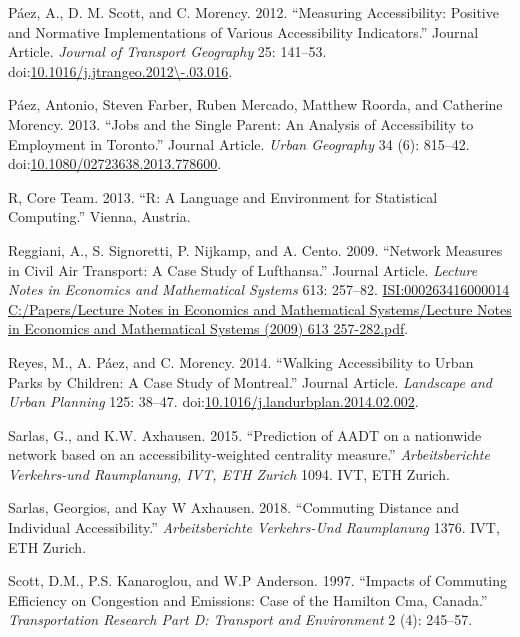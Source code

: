 \documentclass[]{elsarticle} %
\begin{document}
\hypertarget{ref-Paez2012positive}{}
Páez, A., D. M. Scott, and C. Morency. 2012. ``Measuring Accessibility:
Positive and Normative Implementations of Various Accessibility
Indicators.'' Journal Article. \emph{Journal of Transport Geography} 25:
141--53.
doi:\href{https://doi.org/10.1016/j.jtrangeo.2012/-.03.016}{10.1016/j.jtrangeo.2012\textbackslash{}-.03.016}.

\hypertarget{ref-Paez2013jobs}{}
Páez, Antonio, Steven Farber, Ruben Mercado, Matthew Roorda, and
Catherine Morency. 2013. ``Jobs and the Single Parent: An Analysis of
Accessibility to Employment in Toronto.'' Journal Article. \emph{Urban
Geography} 34 (6): 815--42.
doi:\href{https://doi.org/10.1080/02723638.2013.778600}{10.1080/02723638.2013.778600}.

\hypertarget{ref-Rcore}{}
R, Core Team. 2013. ``R: A Language and Environment for Statistical
Computing.'' Vienna, Austria.

\hypertarget{ref-Reggiani2009network}{}
Reggiani, A., S. Signoretti, P. Nijkamp, and A. Cento. 2009. ``Network
Measures in Civil Air Transport: A Case Study of Lufthansa.'' Journal
Article. \emph{Lecture Notes in Economics and Mathematical Systems} 613:
257--82.
\href{ISI:000263416000014\%0AC:/Papers/Lecture\%20Notes\%20in\%20Economics\%20and\%20Mathematical\%20Systems/Lecture\%20Notes\%20in\%20Economics\%20and\%20Mathematical\%20Systems\%20(2009)\%20613\%20257-282.pdf}{ISI:000263416000014
C:/Papers/Lecture Notes in Economics and Mathematical Systems/Lecture Notes in Economics and Mathematical Systems (2009) 613 257-282.pdf}.

\hypertarget{ref-Reyes2014}{}
Reyes, M., A. Páez, and C. Morency. 2014. ``Walking Accessibility to
Urban Parks by Children: A Case Study of Montreal.'' Journal Article.
\emph{Landscape and Urban Planning} 125: 38--47.
doi:\href{https://doi.org/10.1016/j.landurbplan.2014.02.002}{10.1016/j.landurbplan.2014.02.002}.

\hypertarget{ref-Sarlas2015}{}
Sarlas, G., and K.W. Axhausen. 2015. ``Prediction of AADT on a
nationwide network based on an accessibility-weighted centrality
measure.'' \emph{Arbeitsberichte Verkehrs-und Raumplanung, IVT, ETH
Zurich} 1094. IVT, ETH Zurich.

\hypertarget{ref-Sarlas2019}{}
Sarlas, Georgios, and Kay W Axhausen. 2018. ``Commuting Distance and
Individual Accessibility.'' \emph{Arbeitsberichte Verkehrs-Und
Raumplanung} 1376. IVT, ETH Zurich.

\hypertarget{ref-Scott1997impacts}{}
Scott, D.M., P.S. Kanaroglou, and W.P Anderson. 1997. ``Impacts of
Commuting Efficiency on Congestion and Emissions: Case of the Hamilton
Cma, Canada.'' \emph{Transportation Research Part D: Transport and
Environment} 2 (4): 245--57.
\end{document}
